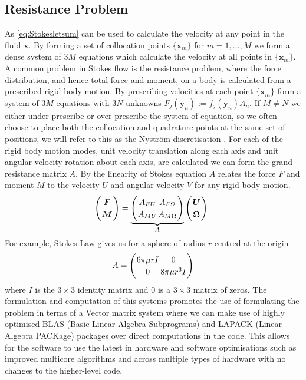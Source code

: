 \subsection{Resistance Problem} \label{sec:resistance}
As \cref{eq:Stokesletsum} can be used to calculate the velocity at any point in the fluid $\bm{x}$. By forming a set of collocation points $\{\bm{x}_m\}$ for $m=1,...,M$ we form a dense system of $3M$ equations which calculate the velocity at all points in $\{\bm{x}_m\}$. 
A common problem in Stokes flow is the resistance problem, where the force distribution, and hence total force and moment, on a body is calculated from a prescribed rigid body motion. By prescribing velocities at each point $\{\bm{x}_m\}$ form a system of $3M$ equations with $3N$ unknowns $F_j(\bm{y}_n) := f_j(\bm{y}_n)A_n$. If $M \neq N$ we either under prescribe or over prescribe the system of equation, so we often choose to place both the collocation and quadrature points at the same set of positions, we will  refer to this as the Nyström discretisation \cite{Nystrom1930UberRandwertaufgaben}. For each of the rigid body motion modes, unit velocity translation along each axis and unit angular velocity rotation about each axis, are calculated we can form the grand resistance matrix $A$\cite{Pozrikidis1992BoundaryFlow}. By the linearity of Stokes equation $A$ relates the force $F$ and moment $M$ to the velocity $U$ and angular velocity $V$ for any rigid body motion. 
\begin{equation*}
\arraycolsep=1pt\def\arraystretch{1.2}
\left(
\begin{array}{c}
\boldsymbol{F} \\
\boldsymbol{M}
\end{array}\right)=\underbrace{\left(\begin{array}{cc}
A_{F U} & A_{F \Omega} \\
A_{M U} & A_{M \Omega}
\end{array}\right)}_{A}\left(\begin{array}{c}
\boldsymbol{U} \\
\boldsymbol{\Omega}
\end{array}\right) .
\end{equation*}
 For example, Stokes Law gives us for a sphere of radius $r$ centred at the origin
 \begin{equation*}
\arraycolsep=1pt\def\arraystretch{1.2}
A=\left(\begin{array}{cc}
6\pi\mu r I & 0 \\
0 & 8\pi\mu r^3 I
\end{array}\right)
\end{equation*}
where $I$ is the $3\times 3$ identity matrix and $0$ is a $3\times 3$ matrix of zeros. The formulation and computation of this systems promotes the use of formulating the problem in terms of a Vector matrix system where we can make use of highly optimised BLAS (Basic Linear Algebra Subprograms) and LAPACK (Linear Algebra PACKage) packages over direct computations in the code. This allows for the software to use the latest in hardware and software optimisations such as improved multicore algorithms and across multiple types of hardware with no changes to the higher-level code.

